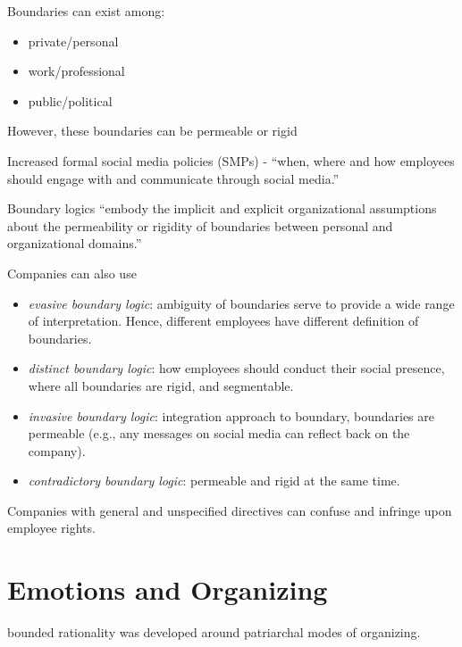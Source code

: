 \documentclass[
]{book}
\providecommand{\tightlist}{%
  \setlength{\itemsep}{0pt}\setlength{\parskip}{0pt}}
\begin{document}
\citep{Banghart_2018}

Boundaries can exist among:

\begin{itemize}
\tightlist
\item
  private/personal
\item
  work/professional
\item
  public/political
\end{itemize}

However, these boundaries can be permeable or rigid

Increased formal social media policies (SMPs) - ``when, where and how employees should engage with and communicate
through social media.'' \citep{Vaast_2013}

Boundary logics ``embody the implicit and explicit organizational assumptions about the permeability or rigidity of
boundaries between personal and organizational domains.''

Companies can also use

\begin{itemize}
\tightlist
\item
  \emph{evasive boundary logic}: ambiguity of boundaries serve to provide a wide range of interpretation. Hence, different
  employees have different definition of boundaries.
\item
  \emph{distinct boundary logic}: how employees should conduct their social presence, where all boundaries are rigid, and
  segmentable.
\item
  \emph{invasive boundary logic}: integration approach to boundary, boundaries are permeable (e.g., any messages on social
  media can reflect back on the company).
\item
  \emph{contradictory boundary logic}: permeable and rigid at the same time.
\end{itemize}

Companies with general and unspecified directives can confuse and infringe upon employee rights.

\hypertarget{emotions-and-organizing}{%
\chapter{Emotions and Organizing}\label{emotions-and-organizing}}

\citep{Mumby_1992}

bounded rationality was developed around patriarchal modes of organizing.
\end{document}
